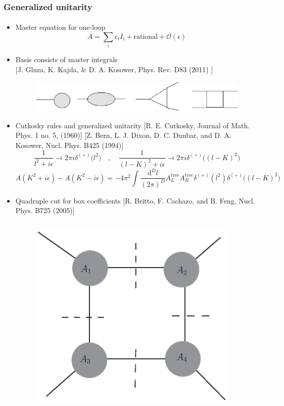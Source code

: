 \documentclass[english]{beamer}
\newcommand{\dd}{\textrm{d}}
\begin{document}
\begin{frame}[shrink=20]
\frametitle{Generalized unitarity}
\framesubtitle{}
\begin{itemize}
\item<1-> Master equation for one-loop
\begin{equation*}
A = \sum_i c_i I_i + \mathrm{rational} + \mathcal{O}(\epsilon)
\end{equation*}
\item<2-> Basis consists of master integrals
\\
\tiny\color{blue}
[J. Gluza, K. Kajda, \& D. A. Kosower, Phys. Rev. D83 (2011)
]
\color{black}\normalsize

\begin{figure}[h]
  \centering
  \includegraphics[width=0.5\linewidth]{master_integrals.jpg}
\end{figure}

\item<3-> Cutkosky rules and generalized unitarity
\tiny\color{blue}
[R. E. Cutkosky, Journal of Math. Phys. 1 no. 5, (1960)]
[Z. Bern, L. J. Dixon, D. C. Dunbar, and D. A. Kosower, Nucl. Phys. B425 (1994)]
\color{black}\normalsize
\begin{equation*}
\frac{1}{l^2 + i\epsilon} \rightarrow 2\pi i\delta^{(+)}\big(l^2\big)
\quad,\quad
\frac{1}{(l-K)^2 + i\epsilon} \rightarrow 2\pi i\delta^{(+)}\big((l-K)^2\big)
\end{equation*}
\small
\begin{equation*}
A(K^2 + i\epsilon) - A(K^2 - i\epsilon) =
-4\pi^2 \int\frac{\dd^D l}{(2\pi)^D}A^{\mathrm{tree}}_LA^{\mathrm{tree}}_R \delta^{(+)}(l^2)\delta^{(+)}\big((l-K)^2\big) 
\end{equation*}
\normalsize

\item<4-> Quadruple cut for box coefficients
    \tiny\color{blue}
[R. Britto, F. Cachazo, and B. Feng, Nucl. Phys. B725 (2005)]
\color{black}\normalsize
\begin{columns}
\begin{column}{0.5\textwidth}
\begin{figure}[h]
  \centering
  \includegraphics[width=0.4\linewidth]{quadruple_cut.eps}
\end{figure}\end{column}
\begin{column}{0.5\textwidth}  %


\end{column}
\end{columns}
\end{itemize}
\end{frame}
\end{document}
